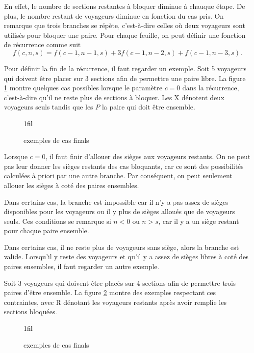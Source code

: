 \documentclass[11pt]{article}
\makeatletter
\newcommand*{\centerfloat}{%
    \parindent \z@%
    \leftskip \z@ \@plus 1fil \@minus \textwidth%
    \rightskip\leftskip%
    \parfillskip \z@skip}%
\makeatother
\begin{document}
En effet, le nombre de sections restantes à bloquer diminue à chauque étape. De plus,
le nombre restant de voyageurs diminue en fonction du cas pris. On remarque que trois
branches se répète, c'est-à-dire celles où deux voyageurs sont utilisés pour bloquer
une paire. Pour chaque feuille, on peut définir une fonction de récurrence comme suit
\begin{equation*}
    f(c,n,s)=f(c-1,n-1,s)+3f(c-1,n-2,s)+f(c-1,n-3,s).
\end{equation*}

Pour définir la fin de la récurrence, il faut regarder un exemple. Soit 5 voyageurs
qui doivent être placer sur 3 sections afin de permettre une paire libre. La figure
\ref{fig:avion_paires} montre quelques cas possibles lorsque le paramètre $c=0$ dans
la récurrence, c'est-à-dire qu'il ne reste plus de sections à bloquer. Les X dénotent
deux voyageurs seuls tandis que les $P$ la paire qui doit être ensemble.

\begin{figure}[H]
    \centerfloat
    
    \caption{exemples de cas finals}
    \label{fig:avion_paires}
\end{figure}

Lorsque $c=0$, il faut finir d'allouer des sièges aux voyageurs restants. On ne peut
pas leur donner les sièges restants des cas bloquants, car ce sont des possibilités
calculées à priori par une autre branche. Par conséquent, on peut seulement allouer
les sièges à coté des paires ensembles.

Dans certains cas, la branche est impossible car il n'y a pas assez de sièges
disponibles pour les voyageurs ou il y plus de sièges alloués que de voyageurs seuls.
Ces conditions se remarque si $n<0$ ou $n>s$, car il y a un siège restant pour chaque
paire ensemble.

Dans certains cas, il ne reste plus de voyageurs sans siège, alors la branche est
valide. Lorsqu'il y reste des voyageurs et qu'il y a assez de sièges libres à coté
des paires ensembles, il faut regarder un autre exemple.

Soit 3 voyageurs qui doivent être placés sur 4 sections afin de permettre trois
paires d'être ensemble. La figure \ref{fig:avion_paires_more} montre des exemples
respectant ces contraintes, avec R dénotant les voyageurs restants après avoir
remplie les sections bloquées.

\begin{figure}[H]
    \centerfloat
    
    \caption{exemples de cas finals}
    \label{fig:avion_paires_more}
\end{figure}
\end{document}
